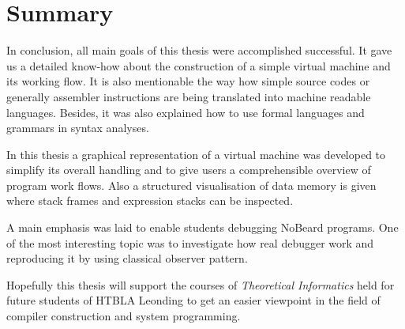 \chapter{Summary}
In conclusion, all main goals of this thesis were accomplished successful. It gave us a detailed know-how about the construction of a simple virtual machine and its working flow. It is also mentionable the way how simple source codes or generally assembler instructions are being translated into machine readable languages. Besides, it was also explained how to use formal languages and grammars in syntax analyses.

In this thesis a graphical representation of a virtual machine was developed to simplify its overall handling and to give users a comprehensible overview of program work flows. Also a structured visualisation of data memory is given where stack frames and expression stacks can be inspected.

A main emphasis was laid to enable students debugging NoBeard programs. One of the most interesting topic was to investigate how real debugger work and reproducing it by using classical observer pattern.

Hopefully this thesis will support the courses of {\em Theoretical Informatics} held for future students of HTBLA Leonding to get an easier viewpoint in the field of compiler construction and system programming.